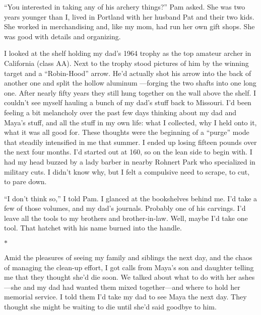 \documentclass[12pt]{book}
\begin{document}
``You interested in taking any of his archery things?'' Pam asked. She was two years younger than I, lived in Portland with her husband Pat and their two kids. She worked in merchandising and, like my mom, had run her own gift shops. She was good with details and organizing.

I looked at the shelf holding my dad's 1964 trophy as the top amateur archer in California (class AA). Next to the trophy stood pictures of him by the winning target and a ``Robin-Hood'' arrow. He'd actually shot his arrow into the back of another one and split the hollow aluminum ---forging the two shafts into one long one. After nearly fifty years they still hung together on the wall above the shelf. I couldn't see myself hauling a bunch of my dad's stuff back to Missouri. I'd been feeling a bit melancholy over the past few days thinking about my dad and Maya's stuff, and all the stuff in my own life: what I collected, why I held onto it, what it was all good for. These thoughts were the beginning of a ``purge'' mode that steadily intensified in me that summer. I ended up losing fifteen pounds over the next four months. I'd started out at 160, so on the lean side to begin with. I had my head buzzed by a lady barber in nearby Rohnert Park who specialized in military cuts. I didn't know why, but I felt a compulsive need to scrape, to cut, to pare down.

``I don't think so,'' I told Pam. I glanced at the bookshelves behind me. I'd take a few of those volumes, and my dad's journals. Probably one of his carvings. I'd leave all the tools to my brothers and brother-in-law. Well, maybe I'd take one tool. That hatchet with his name burned into the handle.

\begin{center}$*$\end{center}

Amid the pleasures of seeing my family and siblings the next day, and the chaos of managing the clean-up effort, I got calls from Maya's son and daughter telling me that they thought she'd die soon. We talked about what to do with her ashes---she and my dad had wanted them mixed together---and where to hold her memorial service. I told them I'd take my dad to see Maya the next day. They thought she might be waiting to die until she'd said goodbye to him.
\end{document}
